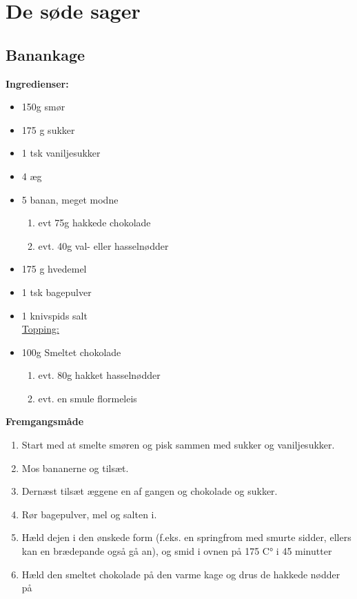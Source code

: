 \documentclass{book}
\begin{document}
{\chapter{De søde sager}

\newpage\section{Banankage}
\begin{minipage}[t]{0.6\textwidth}
\textbf{Ingredienser:}
\begin{itemize}
  \item 150g smør
  \item 175 g sukker
  \item 1 tsk vaniljesukker
  \item 4 æg
  \item 5 banan, meget modne
  \begin{enumerate}
    \item evt 75g hakkede chokolade
    \item evt. 40g val- eller hasselnødder
  \end{enumerate}
  \item  175 g hvedemel
   \item1  tsk bagepulver
   \item 1 knivspids salt 
\\ \underline{Topping:}
 \item 100g Smeltet chokolade
\begin{enumerate}
    \item evt. 80g hakket hasselnødder
    \item evt. en smule flormeleis
\end{enumerate} 
\end{itemize}
\end{minipage}
\begin{minipage}[t]{0.4\textwidth}
\textbf{Fremgangsmåde}
\begin{enumerate}
   \item  Start med at smelte smøren og pisk sammen med sukker og vaniljesukker. 
   \item  Mos bananerne og tilsæt.
   \item  Dernæst tilsæt æggene en af gangen og chokolade og sukker.
   \item  Rør bagepulver, mel og salten i.
   \item  Hæld dejen i den ønskede form (f.eks. en springfrom med smurte sidder, ellers kan en brædepande også gå an), og smid i ovnen på 175 C° i 45 minutter
   \item  Hæld den smeltet chokolade på den varme kage og drus de hakkede nødder på 
\end{enumerate}
\end{minipage}
\newpage
{}
\newpage
\newpage
}
\end{document}
